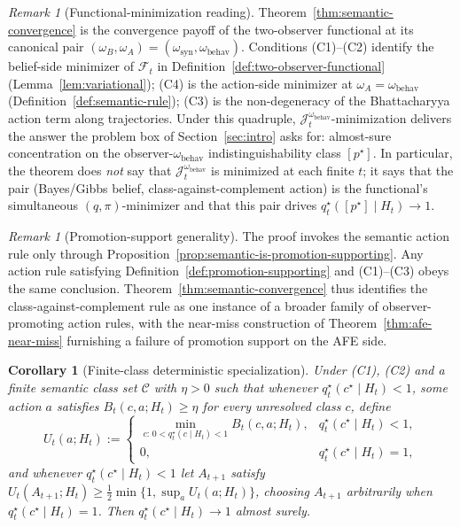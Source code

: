 \documentclass[11pt]{article}
\newtheorem{corollary}[theorem]{Corollary}
\theoremstyle{definition}
\theoremstyle{remark}
\newtheorem{remark}[theorem]{Remark}
\newcommand{\Ccal}{\mathcal{C}}
\begin{document}
\begin{remark}[Functional-minimization reading]
\label{rem:functional-payoff}
Theorem~\ref{thm:semantic-convergence} is the convergence payoff of the two-observer functional at its canonical pair $(\omega_B,\omega_A)=(\omega_{\mathrm{syn}},\omega_{\mathrm{behav}})$. Conditions (C1)--(C2) identify the belief-side minimizer of $\mathcal F_t$ in Definition~\ref{def:two-observer-functional} (Lemma~\ref{lem:variational}); (C4) is the action-side minimizer at $\omega_A=\omega_{\mathrm{behav}}$ (Definition~\ref{def:semantic-rule}); (C3) is the non-degeneracy of the Bhattacharyya action term along trajectories. Under this quadruple, $\mathcal J_t^{\omega_{\mathrm{behav}}}$-minimization delivers the answer the problem box of Section~\ref{sec:intro} asks for: almost-sure concentration on the observer-$\omega_{\mathrm{behav}}$ indistinguishability class $[p^\star]$. In particular, the theorem does \emph{not} say that $\mathcal J_t^{\omega_{\mathrm{behav}}}$ is minimized at each finite $t$; it says that the pair (Bayes/Gibbs belief, class-against-complement action) is the functional's simultaneous $(q,\pi)$-minimizer and that this pair drives $q_t^\star([p^\star]\mid H_t)\to 1$.
\end{remark}

\begin{remark}[Promotion-support generality]
\label{rem:promotion-support}
The proof invokes the semantic action rule only through Proposition~\ref{prop:semantic-is-promotion-supporting}. Any action rule satisfying Definition~\ref{def:promotion-supporting} and (C1)--(C3) obeys the same conclusion. Theorem~\ref{thm:semantic-convergence} thus identifies the class-against-complement rule as one instance of a broader family of observer-promoting action rules, with the near-miss construction of Theorem~\ref{thm:afe-near-miss} furnishing a failure of promotion support on the AFE side.
\end{remark}

\begin{corollary}[Finite-class deterministic specialization]
\label{cor:finite-maximin}
Under (C1), (C2) and a finite semantic class set $\Ccal$ with $\eta>0$ such that whenever $q_t^\star(c^\star\mid H_t)<1$, some action $a$ satisfies $B_t(c,a;H_t)\ge\eta$ for every unresolved class $c$, define
\[
U_t(a;H_t):=
\begin{cases}
\min_{c:\,0<q_t^\star(c\mid H_t)<1}B_t(c,a;H_t), & q_t^\star(c^\star\mid H_t)<1,\\
0, & q_t^\star(c^\star\mid H_t)=1,
\end{cases}
\]
and whenever $q_t^\star(c^\star\mid H_t)<1$ let $A_{t+1}$ satisfy $U_t(A_{t+1};H_t)\ge\tfrac{1}{2}\min\{1,\sup_a U_t(a;H_t)\}$, choosing $A_{t+1}$ arbitrarily when $q_t^\star(c^\star\mid H_t)=1$. Then $q_t^\star(c^\star\mid H_t)\to 1$ almost surely.
\end{corollary}
\end{document}
